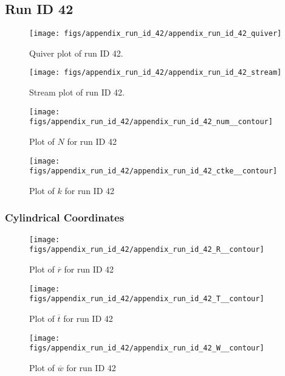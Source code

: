 \subsection{Run ID 42}
\begin{figure}[H]
\centering
\texttt{[image: figs/appendix\_run\_id\_42/appendix\_run\_id\_42\_quiver]}
\caption{Quiver plot of run ID 42.}
\label{fig:appendix_run_id_42_quiver}
\end{figure}


\begin{figure}[H]
\centering
\texttt{[image: figs/appendix\_run\_id\_42/appendix\_run\_id\_42\_stream]}
\caption{Stream plot of run ID 42.}
\label{fig:appendix_run_id_42_stream}
\end{figure}


\begin{figure}[H]
\centering
\texttt{[image: figs/appendix\_run\_id\_42/appendix\_run\_id\_42\_num\_\_contour]}
\caption{Plot of $N$ for run ID 42}
\label{fig:appendix_run_id_42_num__contour}
\end{figure}


\begin{figure}[H]
\centering
\texttt{[image: figs/appendix\_run\_id\_42/appendix\_run\_id\_42\_ctke\_\_contour]}
\caption{Plot of $k$ for run ID 42}
\label{fig:appendix_run_id_42_ctke__contour}
\end{figure}


\subsubsection{Cylindrical Coordinates}
\begin{figure}[H]
\centering
\texttt{[image: figs/appendix\_run\_id\_42/appendix\_run\_id\_42\_R\_\_contour]}
\caption{Plot of $\overline{r}$ for run ID 42}
\label{fig:appendix_run_id_42_R__contour}
\end{figure}


\begin{figure}[H]
\centering
\texttt{[image: figs/appendix\_run\_id\_42/appendix\_run\_id\_42\_T\_\_contour]}
\caption{Plot of $\overline{t}$ for run ID 42}
\label{fig:appendix_run_id_42_T__contour}
\end{figure}


\begin{figure}[H]
\centering
\texttt{[image: figs/appendix\_run\_id\_42/appendix\_run\_id\_42\_W\_\_contour]}
\caption{Plot of $\overline{w}$ for run ID 42}
\label{fig:appendix_run_id_42_W__contour}
\end{figure}


